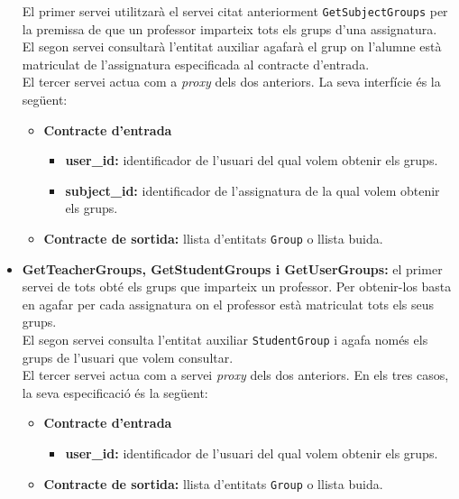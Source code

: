 \begin{itemize}
			El primer servei utilitzarà el servei citat anteriorment \texttt{GetSubjectGroups} per la premissa de que un professor imparteix tots els grups d'una assignatura.\\
			
			El segon servei consultarà l'entitat auxiliar agafarà el grup on l'alumne està matriculat de l'assignatura especificada al contracte d'entrada.\\
			
			El tercer servei actua com a \emph{proxy} dels dos anteriors. La seva interfície és la següent:
				\begin{itemize}
					\item \textbf{Contracte d'entrada}
						\begin{itemize}
							\item \textbf{user\_id:} identificador de l'usuari del qual volem obtenir els grups.
							\item \textbf{subject\_id:} identificador de l'assignatura de la qual volem obtenir els grups.
						\end{itemize}
					\item \textbf{Contracte de sortida:} llista d'entitats \texttt{Group} o llista buida.
				\end{itemize}
			
			\item \textbf{GetTeacherGroups, GetStudentGroups i GetUserGroups:} el primer servei de tots obté els grups que imparteix un professor. Per obtenir-los basta en agafar per cada assignatura on el professor està matriculat tots els seus grups.\\
			
			El segon servei consulta l'entitat auxiliar \texttt{StudentGroup} i agafa només els grups de l'usuari que volem consultar.\\
			
			El tercer servei actua com a servei \emph{proxy} dels dos anteriors. En els tres casos, la seva especificació és la següent:
		
			\begin{itemize}
					\item \textbf{Contracte d'entrada}
						\begin{itemize}
							\item \textbf{user\_id:} identificador de l'usuari del qual volem obtenir els grups.
						\end{itemize}
					\item \textbf{Contracte de sortida:} llista d'entitats \texttt{Group} o llista buida.
				\end{itemize}
				
		\end{itemize}

